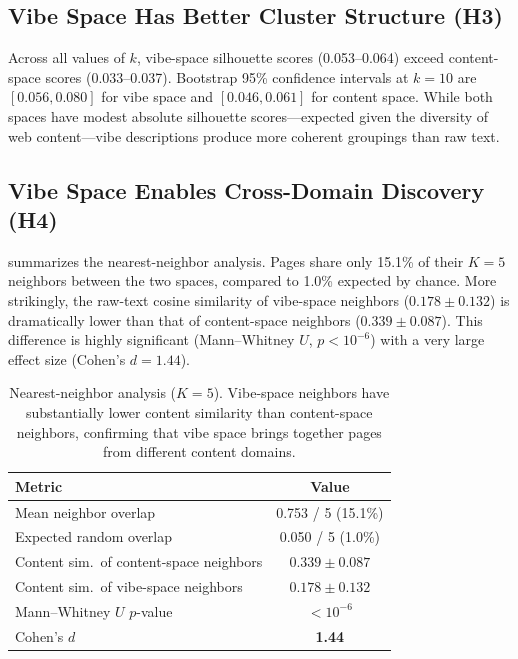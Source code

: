 \subsection{Vibe Space Has Better Cluster Structure (H3)}

Across all values of $k$, vibe-space silhouette scores (0.053--0.064) exceed content-space scores (0.033--0.037).
Bootstrap 95\% confidence intervals at $k{=}10$ are $[0.056, 0.080]$ for vibe space and $[0.046, 0.061]$ for content space.
While both spaces have modest absolute silhouette scores---expected given the diversity of web content---vibe descriptions produce more coherent groupings than raw text.

\subsection{Vibe Space Enables Cross-Domain Discovery (H4)}

 summarizes the nearest-neighbor analysis.
Pages share only 15.1\% of their $K{=}5$ neighbors between the two spaces, compared to 1.0\% expected by chance.
More strikingly, the raw-text cosine similarity of vibe-space neighbors ($0.178 \pm 0.132$) is dramatically lower than that of content-space neighbors ($0.339 \pm 0.087$).
This difference is highly significant (Mann--Whitney $U$, $p < 10^{-6}$) with a very large effect size (Cohen's $d{=}1.44$).

\begin{table}[t]
    \centering
    \caption{Nearest-neighbor analysis ($K{=}5$). Vibe-space neighbors have substantially lower content similarity than content-space neighbors, confirming that vibe space brings together pages from different content domains.}
    \begin{tabular}{@{}lc@{}}
        \toprule
        Metric & Value \\
        \midrule
        Mean neighbor overlap & 0.753 / 5 (15.1\%) \\
        Expected random overlap & 0.050 / 5 (1.0\%) \\
        Content sim.\ of content-space neighbors & $0.339 \pm 0.087$ \\
        Content sim.\ of vibe-space neighbors & $0.178 \pm 0.132$ \\
        Mann--Whitney $U$ $p$-value & $< 10^{-6}$ \\
        Cohen's $d$ & \textbf{1.44} \\
        \bottomrule
    \end{tabular}
    \label{tab:neighbors}
\end{table}


